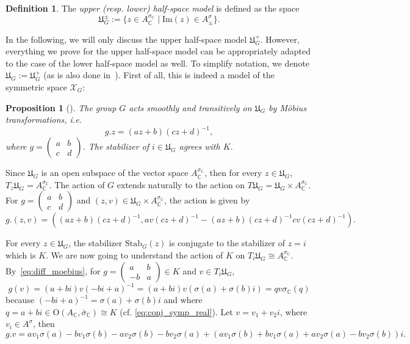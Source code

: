 \documentclass[oneside,11pt]{amsart}
\newtheorem{prop}[thm]{Proposition}
\theoremstyle{definition}
\newtheorem{defn}[thm]{Definition}
\theoremstyle{remark}
\numberwithin{thm}{section}
\numberwithin{equation}{section}
\begin{document}
\begin{defn}
    The \emph{upper (resp. lower) half-space model} is defined as the space
    $$\mathfrak U_G^\pm:=\{z\in A_\mathbb{C}^{\sigma_\mathbb{C}}\mid \mathrm{Im}(z)\in A^\sigma_\pm\}.$$
\end{defn}

\noindent In the following, we will only discuss the upper half-space model $\mathfrak U_G^+$. However, everything we prove for the upper half-space model can be appropriately adapted to the case of the lower half-space model as well. To simplify notation, we denote $\mathfrak U_G:=\mathfrak U_G^+$ (as is also done in~\cite{ABRRW}).  First of all, this is indeed a model of the symmetric space $\mathcal X_{G}$:

\begin{prop}[{\cite[Proposition~5.8]{ABRRW}}]
    The group $G$ acts smoothly and transitively on $\mathfrak{U}_G$ by M\"obius transformations, i.e. 
    $$g.z=(az+b)(cz+d)^{-1},$$ 
    where $g=\begin{pmatrix}
        a & b \\
        c & d
    \end{pmatrix}$. The stabilizer of $i\in\mathfrak{U}_G$ agrees with $K$.
\end{prop}

Since $\mathfrak U_G$ is an open subspace of the vector space $A_\mathbb{C}^{\sigma_\mathbb{C}}$, then for every $z\in \mathfrak U_G$, $T_z\mathfrak U_G = A_\mathbb{C}^{\sigma_\mathbb{C}}$. The action of $G$ extends naturally to the action on $T\mathfrak U_G=\mathfrak U_G\times A^{\sigma_\mathbb C}_\mathbb C$. For $g=\begin{pmatrix}
        a & b \\
        c & d
    \end{pmatrix}$
and $(z,v)\in \mathfrak U_G\times A^{\sigma_\mathbb C}_\mathbb C$, the action is given by 
\begin{equation}\label{eq:diff_moebius}
    g.(z,v)=\left((az+b)(cz+d)^{-1}, av(cz+d)^{-1}-(az+b)(cz+d)^{-1}cv(cz+d)^{-1}\right).  
\end{equation}

For every $z\in\mathfrak U_G$, the stabilizer $\mathrm{Stab}_G(z)$ is conjugate to the stabilizer of $z=i$ which is $K$. We are now going to understand the action of $K$ on $T_i\mathfrak U_G\cong A_\mathbb C^{\sigma_\mathbb C}$. By~\eqref{eq:diff_moebius}, for $g=\begin{pmatrix}
    a & b \\
    -b & a
\end{pmatrix}\in K$ and $v\in T_i\mathfrak U_G$,
$$g(v)
=(a+bi)v(-bi+a)^{-1}
=(a+bi)v(\sigma(a)+\sigma(b)i)=qv\sigma_\mathbb C(q)$$
because $(-bi+a)^{-1}=\sigma(a)+\sigma(b)i$ and where $q=a+bi\in\mathrm O(A_\mathbb C,\bar\sigma_\mathbb C)\cong K$ (cf. \eqref{eq:conj_symp_real}). Let $v=v_1+v_2i$, where $v_i\in A^\sigma$, then
$$g.v
=av_1\sigma(a)-bv_1\sigma(b)-av_2\sigma(b)-bv_2\sigma(a)
+(av_1\sigma(b)+bv_1\sigma(a)+av_2\sigma(a)-bv_2\sigma(b))i.$$
\end{document}
